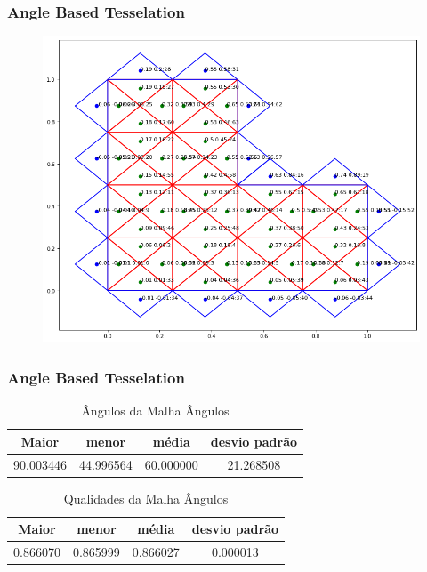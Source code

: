 \documentclass[brazil]{beamer}
\begin{document}
\begin{frame}
  \frametitle{Angle Based Tesselation}

  \begin{figure}
    \includegraphics[width=0.6\linewidth]{fig/malha-angulos.png}
  \end{figure}

\end{frame}
\begin{frame}
  \frametitle{Angle Based Tesselation}

  \begin{table}[hb]
    \centering
    \par\caption{Ângulos da Malha Ângulos}
    \begin{tabular}{c|c|c|c}
      Maior      & menor     & média     & desvio padrão \\\hline\hline
      90.003446	&44.996564&60.000000&21.268508\\\hline
    \end{tabular}
    \label{tab:angulos-malha-angulos}
  \end{table}

  \begin{table}[hb]
    \centering
    \par\caption{Qualidades da Malha Ângulos}
    \begin{tabular}{c|c|c|c}
      Maior    & menor    & média    & desvio padrão \\\hline\hline
      0.866070&0.865999&0.866027	&0.000013\\\hline
    \end{tabular}
    \label{tab:qualidades-malha-angulos}
  \end{table}

\end{frame}
\end{document}
